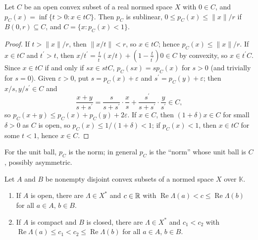 \begin{lemma}\label{functional-analysis:lemma-minkowski}
Let $C$ be an open convex subset of a real normed space $X$ with $0 \in C$, and $p_C(x) = \inf\{t > 0 : x \in tC\}$. Then $p_C$ is sublinear, $0 \leq p_C(x) \leq \|x\|/r$ if $B(0, r) \subseteq C$, and
$C = \{x : p_C(x) < 1\}$.
\end{lemma}

\begin{proof}
If $t > \|x\|/r$, then $\|x/t\| < r$, so $x \in tC$; hence $p_C(x) \leq \|x\|/r$. If $x \in tC$ and $t^{\prime} > t$, then $x/t^{\prime} = \frac{t}{t^{\prime}}(x/t) + (1 - \frac{t}{t^{\prime}})0 \in C$ by convexity, so $x \in t^{\prime}C$.
Since $x \in tC$ if and only if $sx \in stC$, $p_C(sx) = sp_C(x)$ for $s > 0$ (and trivially for $s = 0$). Given $\varepsilon > 0$, put $s = p_C(x) + \varepsilon$ and $s^{\prime} = p_C(y) + \varepsilon$; then $x/s, y/s^{\prime} \in C$ and
\[
\frac{x + y}{s + s^{\prime}} = \frac{s}{s + s^{\prime}}\cdot\frac xs + \frac{s^{\prime}}{s + s^{\prime}}\cdot\frac{y}{s^{\prime}} \in C,
\]
so $p_C(x + y) \leq p_C(x) + p_C(y) + 2\varepsilon$. If $x \in C$, then $(1 + \delta)x \in C$ for small $\delta > 0$ as $C$ is open, so $p_C(x) \leq 1/(1 + \delta) < 1$; if $p_C(x) < 1$, then $x \in tC$ for some $t < 1$, hence
$x \in C$.
\end{proof}

For the unit ball, $p_C$ is the norm; in general $p_C$ is the ``norm'' whose unit ball is $C$, possibly asymmetric.

\begin{theorem}\label{functional-analysis:theorem-separation}
Let $A$ and $B$ be nonempty disjoint convex subsets of a normed space $X$ over $\mathbb{K}$.
\begin{enumerate}
\item If $A$ is open, there are $\Lambda \in X^*$ and $c \in \mathbb{R}$ with $\operatorname{Re}\Lambda(a) < c \leq \operatorname{Re}\Lambda(b)$ for all $a \in A$, $b \in B$.
\item If $A$ is compact and $B$ is closed, there are $\Lambda \in X^*$ and $c_1 < c_2$ with $\operatorname{Re}\Lambda(a) \leq c_1 < c_2 \leq \operatorname{Re}\Lambda(b)$ for all $a \in A$, $b \in B$.
\end{enumerate}
\end{theorem}

